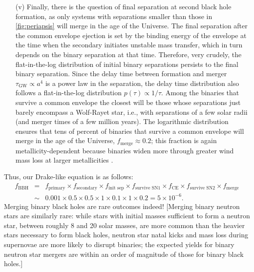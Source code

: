 \documentclass[review]{elsarticle}
\begin{document}
\begin{enumerate}
\item[(v)]  Finally, there is the question of final separation at second black hole formation, as only systems with separations smaller than those in \autoref{fig:periapsis} will merge in the age of the Universe.  The final separation after the common envelope ejection is set by the binding energy of the envelope at the time when the secondary initiates unstable mass transfer, which in turn depends on the binary separation at that time.  Therefore, very crudely, the flat-in-the-log distribution of initial binary separations persists to the final binary separation.  Since the delay time between formation and merger $\tau_\textrm{GW} \propto a^4$ is a power law in the separation, the delay time distribution also follows a flat-in-the-log distribution $p(\tau) \propto 1/\tau$.  Among the binaries that survive a common envelope the closest will be those whose separations just barely encompass a Wolf-Rayet star, i.e., with separations of a few solar radii (and merger times of a few million years).  The logarithmic distribution ensures that tens of percent of binaries that survive a common envelope will merge in the age of the Universe, $f_\textrm{merge} \approx 0.2$; this fraction is again metallicity-dependent because binaries widen more through greater wind mass loss at larger metallicities \citep{Neijssel:2019}. \end{enumerate}

Thus, our Drake-like equation is as follows:
\begin{eqnarray}
f_\textrm{BBH} &=& f_\textrm{primary} \times f_\textrm{secondary} \times f_\textrm{init sep} \times f_\textrm{survive SN1} \times f_\textrm{CE} \times f_\textrm{survive SN2} \times f_\textrm{merge} \nonumber \\
 & \sim & 0.001 \times 0.5 \times 0.5 \times 1 \times 0.1 \times 1 \times 0.2 = 5 \times 10^{-6}.
\end{eqnarray}
Merging binary black holes are rare outcomes indeed!  [Merging binary neutron stars are similarly rare: while stars with initial masses sufficient to form a neutron star, between roughly 8 and 20 solar masses, are more common than the heavier stars necessary to form black holes, neutron star natal kicks and mass loss during supernovae are more likely to disrupt binaries; the expected yields for binary neutron star mergers are within an order of magnitude of those for binary black holes.]
\end{document}
